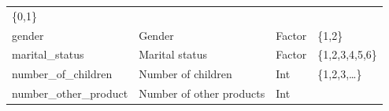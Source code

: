 \documentclass[
]{article}
\begin{document}
\begin{longtable}[]{@{}llll@{}}
\begin{minipage}[t]{0.19\columnwidth}
\{0,1\}\strut
\end{minipage}\tabularnewline
\begin{minipage}[t]{0.30\columnwidth}\raggedright
gender\strut
\end{minipage} & \begin{minipage}[t]{0.30\columnwidth}\raggedright
Gender\strut
\end{minipage} & \begin{minipage}[t]{0.11\columnwidth}\raggedright
Factor\strut
\end{minipage} & \begin{minipage}[t]{0.19\columnwidth}\raggedright
\{1,2\}\strut
\end{minipage}\tabularnewline
\begin{minipage}[t]{0.30\columnwidth}\raggedright
marital\_status\strut
\end{minipage} & \begin{minipage}[t]{0.30\columnwidth}\raggedright
Marital status\strut
\end{minipage} & \begin{minipage}[t]{0.11\columnwidth}\raggedright
Factor\strut
\end{minipage} & \begin{minipage}[t]{0.19\columnwidth}\raggedright
\{1,2,3,4,5,6\}\strut
\end{minipage}\tabularnewline
\begin{minipage}[t]{0.30\columnwidth}\raggedright
number\_of\_children\strut
\end{minipage} & \begin{minipage}[t]{0.30\columnwidth}\raggedright
Number of children\strut
\end{minipage} & \begin{minipage}[t]{0.11\columnwidth}\raggedright
Int\strut
\end{minipage} & \begin{minipage}[t]{0.19\columnwidth}\raggedright
\{1,2,3,\ldots\}\strut
\end{minipage}\tabularnewline
\begin{minipage}[t]{0.30\columnwidth}\raggedright
number\_other\_product\strut
\end{minipage} & \begin{minipage}[t]{0.30\columnwidth}\raggedright
Number of other products\strut
\end{minipage} & \begin{minipage}[t]{0.11\columnwidth}\raggedright
Int\strut
\end{minipage} & \begin{minipage}[t]{0.19\columnwidth}\raggedright

\end{minipage}
\end{longtable}
\end{document}
